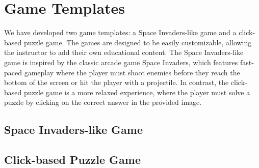\section{Game Templates}
We have developed two game templates: a Space Invaders-like game and a click-based puzzle game. The games are designed to be easily customizable,
allowing the instructor to add their own educational content. The Space Invaders-like game is inspired by the classic arcade game Space Invaders, 
which features fast-paced gameplay where the player must shoot enemies before they reach the bottom of the screen or hit the player with a projectile. In contrast, 
the click-based puzzle game is a more relaxed experience, where the player must solve a puzzle by clicking on the correct answer in the provided image.

\subsection{Space Invaders-like Game}

\subsection{Click-based Puzzle Game}

